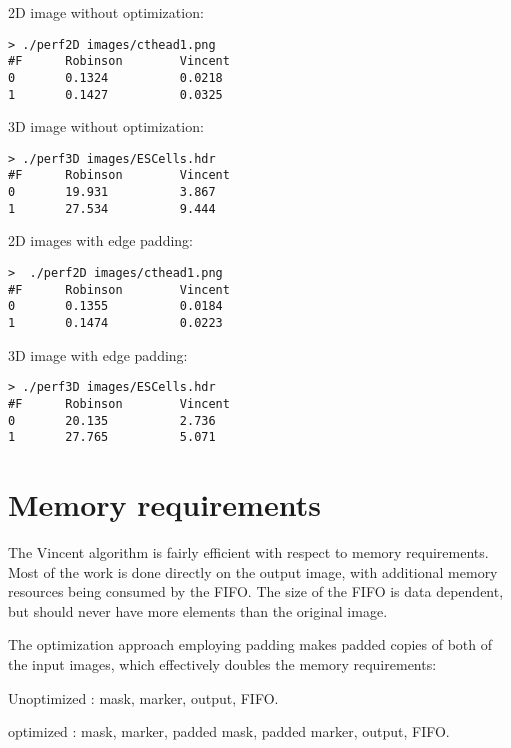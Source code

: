 \documentclass{InsightArticle}
\begin{document}
2D image without optimization:
\begin{verbatim}
> ./perf2D images/cthead1.png
#F      Robinson        Vincent
0       0.1324          0.0218
1       0.1427          0.0325
\end{verbatim}

3D image without optimization:
\begin{verbatim}
> ./perf3D images/ESCells.hdr
#F      Robinson        Vincent
0       19.931          3.867
1       27.534          9.444
\end{verbatim}

2D images with edge padding:
\begin{verbatim}
>  ./perf2D images/cthead1.png
#F      Robinson        Vincent
0       0.1355          0.0184
1       0.1474          0.0223
\end{verbatim}
3D image with edge padding:
\begin{verbatim}
> ./perf3D images/ESCells.hdr
#F      Robinson        Vincent
0       20.135          2.736
1       27.765          5.071
\end{verbatim}

\section{Memory requirements}
The Vincent algorithm is fairly efficient with respect to memory
requirements. Most of the work is done directly on the output image,
with additional memory resources being consumed by the FIFO. The size
of the FIFO is data dependent, but should never have more elements
than the original image.

The optimization approach employing padding makes padded copies of
both of the input images, which effectively doubles the memory
requirements:

Unoptimized : mask, marker, output, FIFO.

optimized : mask, marker, padded mask, padded marker, output, FIFO.
\end{document}

